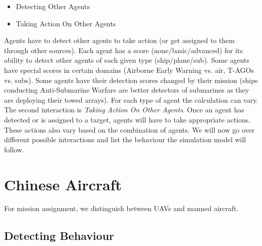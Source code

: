 \documentclass{article}
\begin{document}
\begin{itemize}
    \item Detecting Other Agents
    \item Taking Action On Other Agents 
\end{itemize}
\noindent Agents have to detect other agents to take action (or get assigned to them through other sources). Each agent has a score (none/basic/advanced) for its ability to detect other agents of each given type (ship/plane/sub). Some agents have special scores in certain domains (Airborne Early Warning vs. air, T-AGOs vs. subs). Some agents have their detection scores changed by their mission (ships conducting Anti-Submarine Warfare are better detectors of submarines as they are deploying their towed arrays). For each type of agent the calculation can vary. \\ 

The second interaction is \textit{Taking Action On Other Agents}. Once an agent has detected or is assigned to a target, agents will have to take appropriate actions. These actions also vary based on the combination of agents. We will now go over different possible interactions and list the behaviour the simulation model will follow.

\pagebreak
\section{Chinese Aircraft}

For mission assignment, we distinguish between UAVs and manned aircraft.\\

\subsection{Detecting Behaviour}
    
\end{document}
